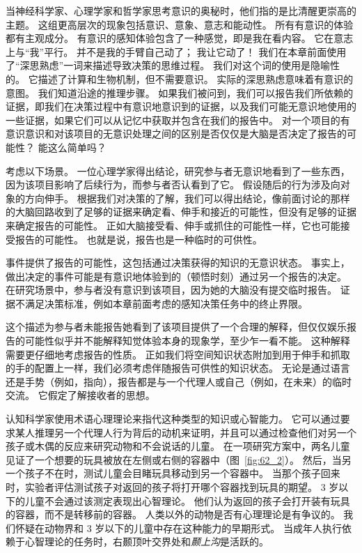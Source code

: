 当神经科学家、心理学家和哲学家思考意识的奥秘时，他们指的是比清醒更崇高的主题。
这组更高层次的现象包括意识、意象、意志和能动性。
所有有意识的体验都有主观成分。
有意识的感知体验包含了一种感觉，即是我在看内容。
它在意志上与“我”平行。
并不是我的手臂自己动了；
我让它动了！
我们在本章前面使用了“深思熟虑”一词来描述导致决策的思维过程。
我们对这个词的使用是隐喻性的。
它描述了计算和生物机制，但不需要意识。
实际的深思熟虑意味着有意识的意图。
我们知道沿途的推理步骤。
如果我们被问到，我们可以报告我们所依赖的证据，即我们在决策过程中有意识地意识到的证据，以及我们可能无意识地使用的一些证据，如果它们可以从记忆中获取并包含在我们的报告中。
对一个项目的有意识意识和对该项目的无意识处理之间的区别是否仅仅是大脑是否决定了报告的可能性？
能这么简单吗？


考虑以下场景。
一位心理学家得出结论，研究参与者无意识地看到了一些东西，因为该项目影响了后续行为，而参与者否认看到了它。
假设随后的行为涉及向对象的方向伸手。
根据我们对决策的了解，我们可以得出结论，像前面讨论的那样的大脑回路收到了足够的证据来确定看、伸手和接近的可能性，但没有足够的证据来确定报告的可能性。
正如大脑接受看、伸手或抓住的可能性一样，它也可能接受报告的可能性。
也就是说，报告也是一种临时的可供性。


事件提供了报告的可能性，这包括通过决策获得的知识的无意识状态。
事实上，做出决定的事件可能是有意识地体验到的（顿悟时刻）通过另一个报告的决定。
在研究场景中，参与者没有意识到该项目，因为她的大脑没有提交临时报告。
证据不满足决策标准，例如本章前面考虑的感知决策任务中的终止界限。


这个描述为参与者未能报告她看到了该项目提供了一个合理的解释，但仅仅娱乐报告的可能性似乎并不能解释知觉体验本身的现象学，至少乍一看不能。
这种解释需要更仔细地考虑报告的性质。
正如我们将空间知识状态附加到用于伸手和抓取的手的配置上一样，我们必须考虑伴随报告可供性的知识状态。
无论是通过语言还是手势（例如，指向），报告都是与一个代理人或自己（例如，在未来）的临时交流。
它假定了解接收者的思想。


认知科学家使用术语心理理论来指代这种类型的知识或心智能力。
它可以通过要求某人推理另一个代理人行为背后的动机来证明，并且可以通过检查他们对另一个孩子或木偶的反应来研究动物和不会说话的儿童。
在一项研究方案中，两名儿童见证了一个想要的玩具被放在左侧或右侧的容器中（图~\ref{fig:62_2}）。
然后，当另一个孩子不在时，测试儿童会目睹玩具移动到另一个容器中。
当那个孩子回来时，实验者评估测试孩子对返回的孩子将打开哪个容器找到玩具的期望。
3 岁以下的儿童不会通过该测定表现出心智理论。
他们认为返回的孩子会打开装有玩具的容器，而不是转移前的容器。
人类以外的动物是否有心理理论是有争议的。
我们怀疑在动物界和 3 岁以下的儿童中存在这种能力的早期形式。
当成年人执行依赖于心智理论的任务时，右颞顶叶交界处和\textit{颞上沟}是活跃的。


